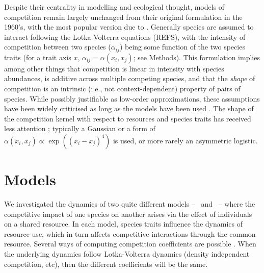 \documentclass[a4paper,11pt]{article}
\begin{document}
Despite their centrality in modelling and ecological thought, models
of competition remain largely unchanged from their original
formulation in the 1960's, with the most popular version due to
\citet{MacArthur-1967}.
Generally species are assumed to interact following the Lotka-Volterra
equations (REFS), with the intensity of competition between two
species ($\alpha_{ij}$) being some function of the two species traits
(for a trait axis $x$, $\alpha_{ij} = \alpha(x_i, x_j)$; see Methods).
%
This formulation implies among other things that competition is linear
in intensity with species abundances, is additive across multiple
competing species, and that the \emph{shape} of competition is an
intrinsic (i.e., not context-dependent) property of pairs of species.
%
While possibly justifiable as low-order approximations, these
assumptions have been widely criticised as long as the models have
been used
\citep[e.g.][]{Andrewartha-1953,May-1972,Abrams-1975}.
%
The shape of the competition kernel with respect to resources and
species traits has received less attention \citep[but
see][]{Abrams-2008,Leimar-2013}; typically a Gaussian or a form of
$\alpha(x_i, x_j) \propto \exp((x_i - x_j)^4)$ is used, or more rarely
an asymmetric logistic.
%




\section{Models}



We investigated the dynamics of two quite different models -- \plant\
and \Rstar\ -- where the competitive impact of one species on another
arises via the effect of individuals on a shared resource. In each
model, species traits influence the dynamics of resource use, which in
turn affects competitive interactions through the common resource.
Several ways of computing competition coefficients are possible
\citep[e.g.,][]{Abrams-1987,Abrams-2008}.  When the underlying
dynamics follow Lotka-Volterra dynamics (density independent
competition, etc), then the different coefficients will be the same.
\end{document}
